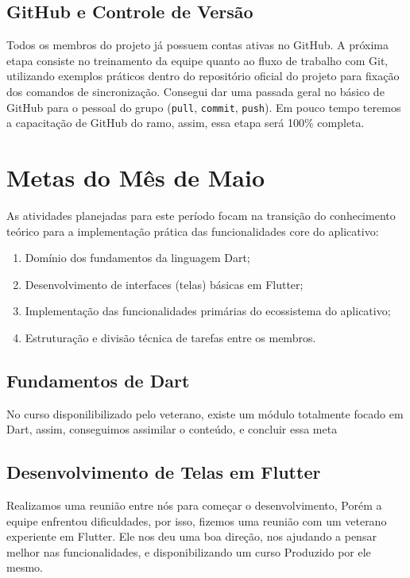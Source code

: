 \subsection{GitHub e Controle de Versão}
Todos os membros do projeto já possuem contas ativas no GitHub. A próxima etapa consiste no treinamento da equipe quanto ao fluxo de trabalho com Git, utilizando exemplos práticos dentro do repositório oficial do projeto para fixação dos comandos de sincronização.
Consegui dar uma passada geral no básico de GitHub para o pessoal do grupo (\texttt{pull}, \texttt{commit}, \texttt{push}).
Em pouco tempo teremos a capacitação de GitHub do ramo, assim, essa etapa será 100\% completa.

\section{Metas do Mês de Maio}
As atividades planejadas para este período focam na transição do conhecimento teórico para a implementação prática das funcionalidades core do aplicativo:

\begin{enumerate}
    \item Domínio dos fundamentos da linguagem Dart;
    \item Desenvolvimento de interfaces (telas) básicas em Flutter;
    \item Implementação das funcionalidades primárias do ecossistema do aplicativo;
    \item Estruturação e divisão técnica de tarefas entre os membros.
\end{enumerate}

\subsection{Fundamentos de Dart}
No curso disponilibilizado pelo veterano, existe um módulo totalmente focado em Dart, assim, conseguimos assimilar o conteúdo, e concluir essa meta

\subsection{Desenvolvimento de Telas em Flutter}
Realizamos uma reunião entre nós para começar o desenvolvimento, Porém a equipe enfrentou dificuldades, por isso, fizemos uma reunião com um veterano experiente em Flutter. Ele nos deu uma boa direção, nos ajudando a pensar melhor nas funcionalidades, e disponibilizando um curso Produzido por ele mesmo.

